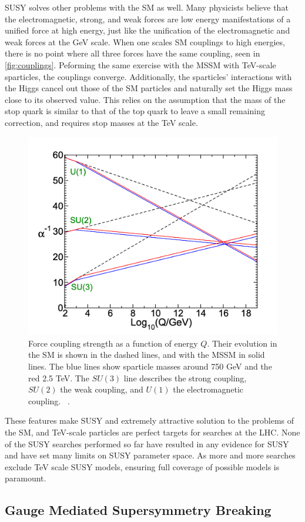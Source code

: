 \ac{SUSY} solves other problems with the \ac{SM} as well. Many physicists believe that the electromagnetic, strong, and weak forces are low energy manifestations of a unified force at high energy, just like the unification of the electromagnetic and weak forces at the GeV scale. When one scales \ac{SM} couplings to high energies, there is no point where all three forces have the same coupling, seen in \autoref{fig:couplings}. Peforming the same exercise with the \ac{MSSM} with TeV-scale sparticles, the couplings converge. Additionally, the sparticles' interactions with the Higgs cancel out those of the \ac{SM} particles and naturally set the Higgs mass close to its observed value. This relies on the assumption that the mass of the stop quark is similar to that of the top quark to leave a small remaining correction, and requires stop masses at the TeV scale.

\begin{figure}[!h]
\centering
\includegraphics[width=.4\textwidth]{figures/theory/couplings.png}
\caption{Force coupling strength as a function of energy $Q$. Their evolution in the \ac{SM} is shown in the dashed lines, and with the \ac{MSSM} in solid lines. The blue lines show sparticle masses around 750 GeV and the red 2.5 TeV. The $SU(3)$ line describes the strong coupling, $SU(2)$ the weak coupling, and $U(1)$ the electromagnetic coupling. ~\cite{susy-primer}.}
\label{fig:couplings}
\end{figure}

These features make \ac{SUSY} and extremely attractive solution to the problems of the \ac{SM}, and TeV-scale particles are perfect targets for searches at the \ac{LHC}. None of the \ac{SUSY} searches performed so far have resulted in any evidence for \ac{SUSY} and have set many limits on \ac{SUSY} parameter space. As more and more searches exclude TeV scale \ac{SUSY} models, ensuring full coverage of possible models is paramount.





\subsection{Gauge Mediated Supersymmetry Breaking}
\label{sec:gmsb}

